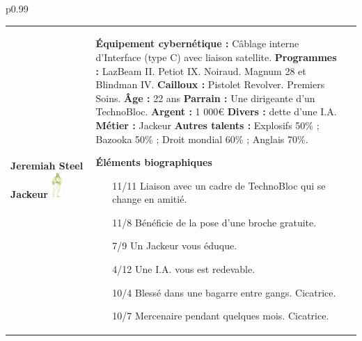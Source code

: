 \documentclass[11pt,twoside,a4paper]{article}
\begin{document}
\begin{longtable}[ht]{ p{} }
		\hline
	\begin{tabular}[h]{ p{} p{} p{} }
		\textbf{Jeremiah Steel}										\newline
		\textbf{\small Jackeur}										\newline
			\newline
		\includegraphics[width=0.15\textwidth]{img/personnageJeremiahSteel.jpg}		
			\newline
			
		& %
			
		\textbf{{\'E}quipement cybern{\'e}tique : }C{\^a}blage interne d'Interface (type C) avec liaison satellite. \newline
		\textbf{Programmes : }LazBeam II. Petiot IX. Noiraud. Magnum 28 et Blindman IV. \newline
		\textbf{Cailloux : }Pistolet Revolver. Premiers Soins. \newline
		\textbf{{\^A}ge : } 22 ans 											\newline
		\textbf{Parrain : } Une dirigeante d'un TechnoBloc. 				\newline
		\textbf{Argent : } 1 000\euro 										\newline
		\textbf{Divers : } dette d'une I.A.									\newline
		\textbf{M{\'e}tier : } Jackeur 										\newline
		\textbf{Autres talents : } Explosifs 50\% ; Bazooka 50\% ; Droit mondial 60\% ; Anglais 70\%. \newline
		
		\textbf{{\'E}l{\'e}ments biographiques}
		\begin{itemize}
			\item[11/11] Liaison avec un cadre de TechnoBloc qui se change en amiti{\'e}. 
			\item[11/8] B{\'e}n{\'e}ficie de la pose d'une broche gratuite. 
			\item[7/9] Un Jackeur vous {\'e}duque. 
			\item[4/12] Une I.A. vous est redevable. 
			\item[10/4] Bless{\'e} dans une bagarre entre gangs. Cicatrice. 
			\item[10/7] Mercenaire pendant quelques mois. Cicatrice. 
		\end{itemize}
		

\end{tabular}
\end{longtable}
\end{document}
